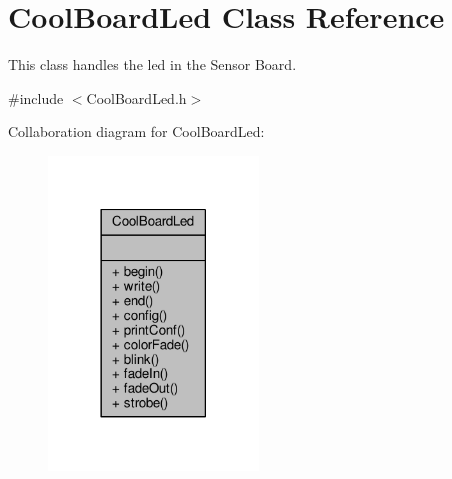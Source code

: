 \hypertarget{class_cool_board_led}{}\section{Cool\+Board\+Led Class Reference}
\label{class_cool_board_led}


This class handles the led in the Sensor Board.  




{\ttfamily \#include $<$Cool\+Board\+Led.\+h$>$}



Collaboration diagram for Cool\+Board\+Led\+:\nopagebreak
\begin{figure}[H]
\begin{center}
\leavevmode
\includegraphics[width=158pt]{class_cool_board_led__coll__graph}
\end{center}
\end{figure}
